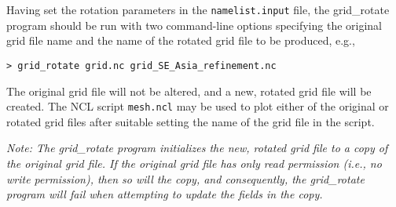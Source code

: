 Having set the rotation parameters in the {\tt namelist.input} file, the
grid\_rotate program should be run with two command-line options specifying the
original grid file name and the name of the rotated grid file to be produced,
e.g.,

\vspace{12pt}
{\tt > grid\_rotate grid.nc grid\_SE\_Asia\_refinement.nc}
\vspace{12pt}

The original grid file will not be altered, and a new, rotated grid file will be
created. The NCL script {\tt mesh.ncl} may be used to plot either of the
original or rotated grid files after suitable setting the name of the grid file
in the script.

\vspace{12pt}
{\em Note: The grid\_rotate program initializes the new, rotated grid file to a copy of the original grid file.
If the original grid file has only read permission (i.e., no write permission), then so will the copy, and
consequently, the grid\_rotate program will fail when attempting to update the fields in the copy.}
   
